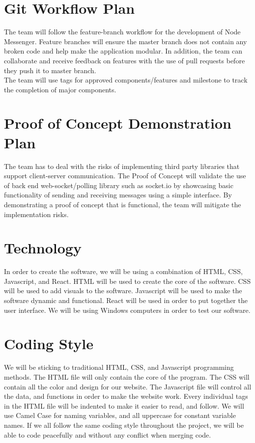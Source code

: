 \documentclass{article}
\begin{document}
\section{Git Workflow Plan}
The team will follow the feature-branch workflow for the development of Node Messenger. Feature branches will ensure the master branch does not contain any broken code and help make the application modular. In addition, the team can collaborate and receive feedback on features with the use of pull requests before they push it to master branch. \\
The team will use tags for approved components/features and milestone to track the completion of major components. 
\section{Proof of Concept Demonstration Plan}
The team has to deal with the risks of implementing third party libraries that support client-server communication. The Proof of Concept will validate the use of back end web-socket/polling library such as socket.io by showcasing basic functionality of sending and receiving messages using a simple interface. By demonstrating a proof of concept that is functional, the team will mitigate the implementation risks. 
\section{Technology}
In order to create the software, we will be using a combination of HTML, CSS, Javascript, and React. HTML will be used to create the core of the software. CSS will be used to add visuals to the software. Javascript will be used to make the software dynamic and functional. React will be used in order to put together the user interface. We will be using Windows computers in order to test our software.
\section{Coding Style}
We will be sticking to traditional HTML, CSS, and Javascript programming methods. The HTML file will only contain the core of the program. The CSS will contain all the color and design for our website. The Javascript file will control all the data, and functions in order to make the website work. Every individual tags in the HTML file will be indented to make it easier to read, and follow. We will use Camel Case for naming variables, and all uppercase for constant variable names. If we all follow the same coding style throughout the project, we will be able to code peacefully and without any conflict when merging code.
\end{document}
